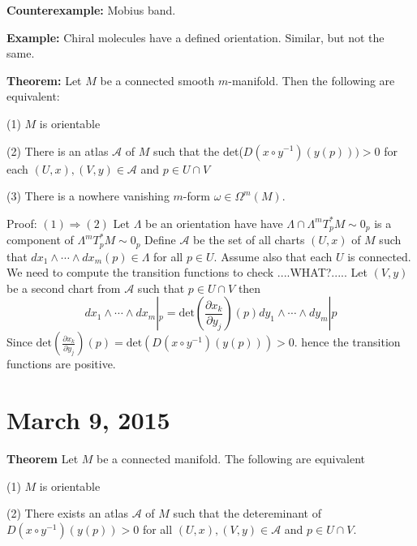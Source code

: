 \documentclass{article}
\begin{document}
\textbf{Counterexample:} Mobius band.

\textbf{Example:} Chiral molecules have a defined orientation. Similar, but not the same.

\textbf{Theorem:} Let $M$ be a connected smooth $m$-manifold. Then the following are equivalent:

(1) $M$ is orientable

(2) There is an atlas $\mathcal{A}$ of $M$ such that the det($D(x \circ y^{-1})(y(p))) > 0$   for each $(U,x), (V,y) \in \mathcal{A}$ and $p \in U \cap V$

(3) There is a nowhere vanishing $m$-form $\omega \in \Omega^m(M)$.  

Proof: $(1) \Rightarrow (2)$ Let $\Lambda$ be an orientation have have $\Lambda \cap \Lambda^mT^*_pM \sim 0_p$ is a component of $\Lambda^mT^*_pM \sim 0_p$ Define $\mathcal{A}$ be the set of all charts $(U,x)$ of $M$ such that $dx_1 \wedge \cdots \wedge dx_m(p) \in \Lambda$ for all $p \in U$. Assume also that each $U$ is connected. We need to compute the transition functions to check ....WHAT?..... Let $(V,y)$ be a second chart from $\mathcal{A}$ such that $p \in U \cap V$ then 
\[
dx_1 \wedge \cdots \wedge dx_m |_p = \text{det}(\frac{\partial x_k}{\partial y_j})(p)dy_1 \wedge \cdots \wedge dy_m|p
\] 
Since $\text{det}(\frac{\partial x_k}{\partial y_j})(p) = \text{det}(D(x \circ y^{-1})(y(p))) > 0$. hence the transition functions are positive.

\section{March 9, 2015}

\textbf{Theorem} Let $M$ be a connected manifold. The following are equivalent

(1) $M$ is orientable

(2) There exists an atlas $\mathscr{A}$ of $M$ such that the detereminant of $D(x \circ y^{-1})(y(p)) > 0$ for all $(U,x), (V,y) \in \mathscr{A}$ and $p \in U \cap V$.
\end{document}

